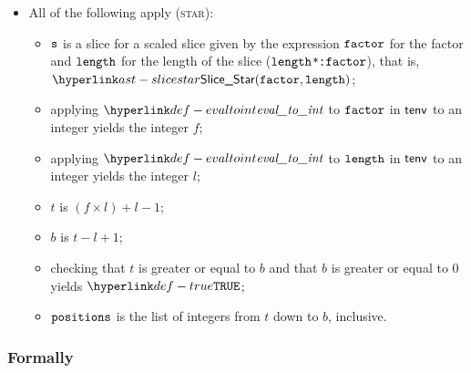 \begin{itemize}
  \item All of the following apply (\textsc{star}):
  \begin{itemize}
    \item $\texttt{s}$ is a slice for a scaled slice given by the expression $\texttt{factor}$
          for the factor and $\texttt{length}$ for the length of the slice (\texttt{$\texttt{length}$*:$\texttt{factor}$}),
          that is, \\ $\SliceStar(\efactor, \elength)$;
    \item applying $\evaltoint$ to $\texttt{factor}$ in $\textsf{tenv}$ to an integer yields the integer $f$\ProseOrTypeError;
    \item applying $\evaltoint$ to $\texttt{length}$ in $\textsf{tenv}$ to an integer yields the integer $l$\ProseOrTypeError;
    \item $t$ is $(f \times l) + l - 1$;
    \item $b$ is $t - l + 1$;
    \item checking that $t$ is greater or equal to $b$ and that $b$ is greater or equal to $0$ yields $\True$\ProseOrTypeError;
    \item $\texttt{positions}$ is the list of integers from $t$ down to $b$, inclusive.
  \end{itemize}
\end{itemize}

\subsubsection{Formally}

